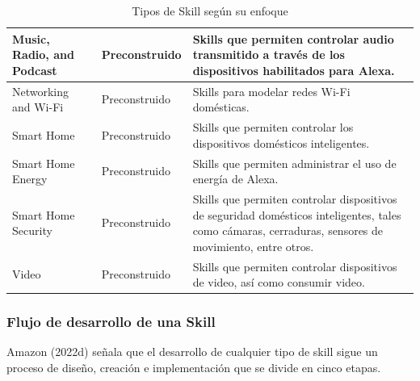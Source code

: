 \begin{table}[H]
\begin{center}
\begin{tabular}{ | p{4cm} | p{4cm} | p{8cm} | }
      Music, Radio, and Podcast & Preconstruido & Skills que permiten controlar audio transmitido a través de los dispositivos habilitados para Alexa. \\ \hline
      Networking and Wi-Fi & Preconstruido & Skills para modelar redes Wi-Fi domésticas. \\ \hline
      Smart Home & Preconstruido & Skills que permiten controlar los dispositivos domésticos inteligentes. \\ \hline
      Smart Home Energy & Preconstruido & Skills que permiten administrar el uso de energía de Alexa. \\ \hline
      Smart Home Security & Preconstruido & Skills que permiten controlar dispositivos de seguridad domésticos inteligentes, tales como cámaras, cerraduras, sensores de movimiento, entre otros. \\ \hline
      Video & Preconstruido & Skills que permiten controlar dispositivos de video, así como consumir video. \\ \hline
    \end{tabular}
    \caption{Tipos de Skill según su enfoque}
    \label{tab:t41}
  \end{center}
\end{table}


\subsubsection{Flujo de desarrollo de una Skill}
\label{FlujoSkillcapIV}

Amazon (2022d) señala que el desarrollo de cualquier tipo de skill sigue un proceso de diseño, creación e implementación que se divide en cinco etapas.

